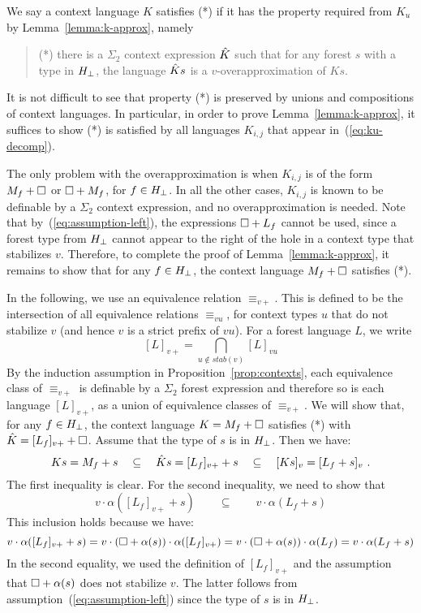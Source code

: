 \documentclass{LMCS}
\begin{document}
We say a context language $K$ satisfies (*) if it has the property
required from $K_u$ by Lemma~\ref{lemma:k-approx}, namely
\begin{quote}
	(*) there
	is a $\Sigma_2$ context expression $\hat{K}$ such that for any
	forest $s$ with a type in ${H_\bot}$, the language $\hat{K} s$ is a
	$v$-overapproximation of $Ks$.	
\end{quote}
  It is not difficult to see that
property (*) is preserved by unions and compositions of context
languages. In particular, in order to prove
Lemma~\ref{lemma:k-approx}, it suffices to show (*) is satisfied by
all languages $K_{i,j}$ that appear in~(\ref{eq:ku-decomp}).

The only problem with the overapproximation is when $K_{i,j}$ is of
the form $M_f + \Box$ or $\Box + M_f$, for $f \in {H_\bot}$. In all
the other cases, $K_{i,j}$ is known to be definable by a $\Sigma_2$
context expression, and no overapproximation is needed. Note that
by~(\ref{eq:assumption-left}), the expressions $\Box+L_f$ cannot be
used, since a forest type from ${H_\bot}$ cannot appear to the right
of the hole in a context type that stabilizes $v$. Therefore, to complete
the proof of Lemma~\ref{lemma:k-approx}, it remains to show that for
any $f \in {H_\bot}$, the context language $M_f + \Box$ satisfies
(*).

In the following, we use an equivalence relation $\equiv_{v+}$. This is defined
to be the intersection of all equivalence relations $\equiv_{vu}$, for context
types $u$ that do not stabilize $v$ (and hence $v$ is a strict prefix of $vu$).
For a forest language $L$, we write
\begin{equation}
  \label{eq:v+}
    [L]_{v+} = \bigcap_{u \not \in stab(v)} [L]_{vu}
\end{equation}
By the induction assumption in Proposition~\ref{prop:contexts}, each
equivalence class of $\equiv_{v+}$ is definable by a $\Sigma_2$ forest
expression and therefore so is each language $[L]_{v+}$, as a union of
equivalence classes of $\equiv_{v+}$. We will show that, for any $f
\in {H_\bot}$, the context language $K=M_f + \Box$ satisfies (*) with
$\hat{K} = [L_f]_{v+}+\Box$.  Assume that the type of $s$ is
 in ${H_\bot}$. Then we have:
\[
  Ks  = M_f +s \quad \subseteq \quad
  \hat{K} s = 
  [L_f]_{v+} + s
  \quad \subseteq \quad [Ks]_v = [L_f+s]_v \ .
\]
The first inequality is clear. For the second inequality, we need to
show that 
\[
  v \cdot \alpha([L_f]_{v+} +s) \qquad \subseteq \qquad v \cdot
  \alpha(L_f + s) 
\]
This inclusion holds because we have:
\[
  v \cdot \alpha([L_f]_{v+} +s) = v \cdot (\Box +
  \alpha(s)) \cdot \alpha([L_f]_{v+})  =    v \cdot (\Box +
  \alpha(s)) \cdot \alpha(L_f)  = v \cdot   \alpha(L_f + s) 
\]
In the second equality, we used the definition of $[L_f]_{v+}$ and the
assumption that $\Box + \alpha(s)$ does not stabilize $v$. The latter
follows from assumption~(\ref{eq:assumption-left}) since the type of
$s$ is in ${H_\bot}$.
\end{document}
